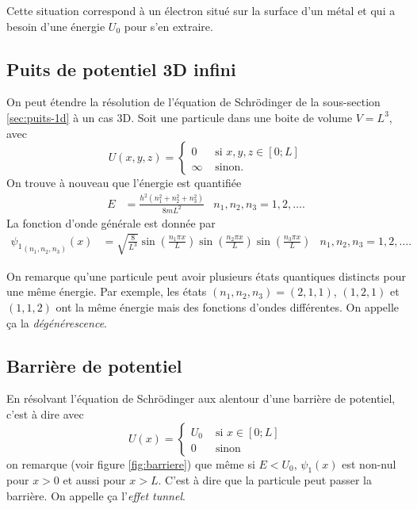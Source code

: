\begin{myrem}
	Cette situation correspond à un électron
	situé sur la surface d'un métal et qui a besoin
	d'une énergie $U_0$ pour s'en extraire.
\end{myrem}

\subsection{Puits de potentiel 3D infini}
On peut étendre la résolution de l'équation de Schrödinger
de la sous-section \ref{sec:puits-1d} à un cas 3D.
Soit une particule dans une boite de volume $V = L^3$,
avec
\[ U(x,y,z) = \left\{
  \begin{aligned}
    0 & \text{ si } x,y,z \in [0; L]\\
    \infty & \text{ sinon}.
  \end{aligned}
\right. \]
On trouve à nouveau que l'énergie est quantifiée
\begin{align*}
  E & = \frac{h^2(n_1^2+n_2^2+n_3^2)}{8mL^2} & n_1,n_2,n_3 = 1, 2, \ldots.
\end{align*}
La fonction d'onde générale est donnée par
\begin{align*}
  {\psi_1}_{(n_1,n_2,n_3)}(x) & =
  \sqrt{\frac{8}{L^3}}\sin\left(\frac{n_1\pi x}{L}\right)
											\sin\left(\frac{n_2\pi x}{L}\right)
											\sin\left(\frac{n_3\pi x}{L}\right)& n_1,n_2,n_3 = 1, 2, \ldots.
\end{align*}

On remarque qu'une particule peut avoir plusieurs états
quantiques distincts pour une même énergie. Par exemple,
les états $(n_1,n_2,n_3) = (2,1,1)$, $(1,2,1)$ et $(1,1,2)$
ont la même énergie mais des fonctions d'ondes différentes.
On appelle ça la \emph{dégénérescence}.
\subsection{Barrière de potentiel}
En résolvant l'équation de Schrödinger
aux alentour d'une barrière de potentiel,
c'est à dire avec
\[ U(x) = \left\{
  \begin{aligned}
    U_0 & \text{ si } x \in [0; L]\\
    0 & \text{ sinon}
  \end{aligned}
\right. \]
on remarque (voir figure \ref{fig:barriere}) que même si $E < U_0$,
$\psi_1(x)$ est non-nul pour $x > 0$ et aussi pour $x > L$.
C'est à dire que la particule peut passer la barrière.
On appelle ça l'\emph{effet tunnel}.

